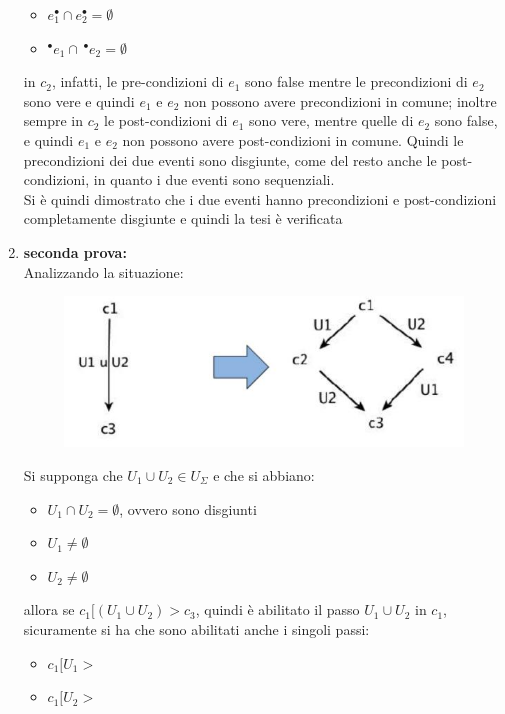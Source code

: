 \begin{esempio}
\begin{enumerate}
  \begin{itemize}
    \item $e_1^\bullet\cap e_2^\bullet=\emptyset$
    \item $^\bullet e_1\cap\, ^\bullet e_2=\emptyset$
  \end{itemize}
  in $c_2$, infatti, le pre-condizioni di $e_1$ sono false mentre le
  precondizioni di $e_2$ sono vere e quindi $e_1$ e $e_2$ non possono avere
  precondizioni in comune; inoltre sempre in $c_2$ le post-condizioni di $e_1$
  sono vere, mentre quelle di $e_2$ sono false, e quindi $e_1$ e $e_2$ non
  possono avere post-condizioni in comune. Quindi le precondizioni dei due
  eventi sono disgiunte, come del resto anche le post-condizioni, in quanto i due
  eventi sono sequenziali.\\
  Si è quindi dimostrato che i due eventi hanno precondizioni e post-condizioni
  completamente disgiunte e quindi la tesi è verificata
  \item \textbf{seconda prova:}\\
  Analizzando la situazione:
  \begin{figure}[H]
    \centering
    \includegraphics[scale = 0.45]{img/diam2.jpg}
  \end{figure}
  \newpage
  Si supponga che $U_1\cup U_2\in U_\Sigma$ e che si abbiano:
  \begin{itemize}
    \item $U_1\cap U_2=\emptyset$, ovvero sono disgiunti
    \item $U_1\neq\emptyset$
    \item $U_2\neq\emptyset$
  \end{itemize}
  allora se $c_1[(U_1\cup U_2)>c_3$, quindi è abilitato il passo $U_1\cup U_2$
  in $c_1$, sicuramente si ha che sono abilitati anche i singoli passi:
  \begin{itemize}
    \item $c_1[U_1>$
    \item $c_1[U_2>$
  \end{itemize}

\end{enumerate}
\end{esempio}
